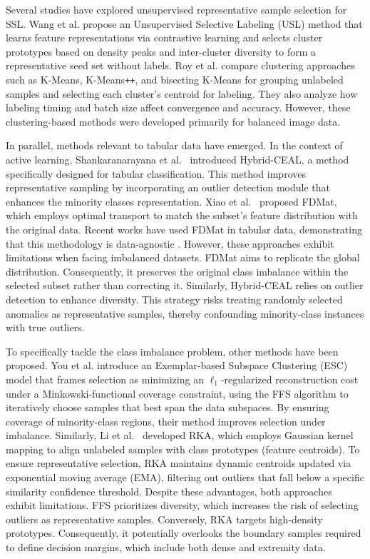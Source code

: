 \documentclass[preprint,12pt]{elsarticle}
\begin{document}
Several studies have explored unsupervised representative sample selection for SSL. Wang et al. \cite{wang2022unsupervised} propose an Unsupervised Selective Labeling (USL) method that learns feature representations via contrastive learning \cite{li2025leukocyte} and selects cluster prototypes based on density peaks and inter-cluster diversity to form a representative seed set without labels. Roy et al. \cite{roy2024impact} compare clustering approaches such as K-Means, K-Means\texttt{++}, and bisecting K-Means for grouping unlabeled samples and selecting each cluster’s centroid for labeling. They also analyze how labeling timing and batch size affect convergence and accuracy. However, these clustering-based methods were developed primarily for balanced image data.

In parallel, methods relevant to tabular data have emerged. In the context of active learning, Shankaranarayana et al.~\cite{shankaranarayana2024hybrid} introduced Hybrid-CEAL, a method specifically designed for tabular classification. This method improves representative sampling by incorporating an outlier detection module that enhances the minority classes representation. Xiao et al.~\cite{xiao2024feature} proposed FDMat, which employs optimal transport to match the subset's feature distribution with the original data. Recent works have used FDMat in tabular data, demonstrating that this methodology is data-agnostic \cite{hadar2024datamap}. However, these approaches exhibit limitations when facing imbalanced datasets. FDMat aims to replicate the global distribution. Consequently, it preserves the original class imbalance within the selected subset rather than correcting it. Similarly, Hybrid-CEAL relies on outlier detection to enhance diversity. This strategy risks treating randomly selected anomalies as representative samples, thereby confounding minority-class instances with true outliers.

To specifically tackle the class imbalance problem, other methods have been proposed. You et al. \cite{you2020self} introduce an Exemplar-based Subspace Clustering (ESC) model that frames selection as minimizing an $\ell_1$-regularized reconstruction cost under a Minkowski-functional coverage constraint, using the FFS algorithm to iteratively choose samples that best span the data subspaces. By ensuring coverage of minority-class regions, their method improves selection under imbalance. Similarly, Li et al.~\cite{li2025kernel} developed RKA, which employs Gaussian kernel mapping to align unlabeled samples with class prototypes (feature centroids). To ensure representative selection, RKA maintains dynamic centroids updated via exponential moving average (EMA), filtering out outliers that fall below a specific similarity confidence threshold. Despite these advantages, both approaches exhibit limitations. FFS prioritizes diversity, which increases the risk of selecting outliers as representative samples. Conversely, RKA targets high-density prototypes. Consequently, it potentially overlooks the boundary samples required to define decision margins, which include both dense and extremity data.
\end{document}
